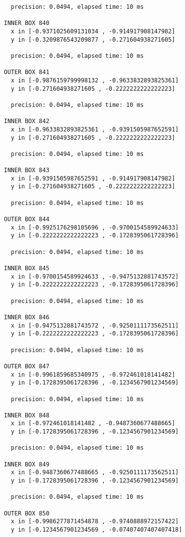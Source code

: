 \begin{verbatim}
  precision: 0.0494, elapsed time: 10 ms

INNER BOX 840
  x in [-0.9371025609131034 , -0.914917908147982]
  y in [-0.3209876543209877 , -0.271604938271605]

  precision: 0.0494, elapsed time: 10 ms

OUTER BOX 841
  x in [-0.9876159799998132 , -0.9633832893825361]
  y in [-0.271604938271605 , -0.2222222222222223]

  precision: 0.0494, elapsed time: 10 ms

INNER BOX 842
  x in [-0.9633832893825361 , -0.9391505987652591]
  y in [-0.271604938271605 , -0.2222222222222223]

  precision: 0.0494, elapsed time: 10 ms

INNER BOX 843
  x in [-0.9391505987652591 , -0.914917908147982]
  y in [-0.271604938271605 , -0.2222222222222223]

  precision: 0.0494, elapsed time: 10 ms

OUTER BOX 844
  x in [-0.9925176298105696 , -0.9700154589924633]
  y in [-0.2222222222222223 , -0.1728395061728396]

  precision: 0.0494, elapsed time: 10 ms

INNER BOX 845
  x in [-0.9700154589924633 , -0.9475132881743572]
  y in [-0.2222222222222223 , -0.1728395061728396]

  precision: 0.0494, elapsed time: 10 ms

INNER BOX 846
  x in [-0.9475132881743572 , -0.9250111173562511]
  y in [-0.2222222222222223 , -0.1728395061728396]

  precision: 0.0494, elapsed time: 10 ms

OUTER BOX 847
  x in [-0.9961859685340975 , -0.972461018141482]
  y in [-0.1728395061728396 , -0.1234567901234569]

  precision: 0.0494, elapsed time: 10 ms

INNER BOX 848
  x in [-0.972461018141482 , -0.9487360677488665]
  y in [-0.1728395061728396 , -0.1234567901234569]

  precision: 0.0494, elapsed time: 10 ms

INNER BOX 849
  x in [-0.9487360677488665 , -0.9250111173562511]
  y in [-0.1728395061728396 , -0.1234567901234569]

  precision: 0.0494, elapsed time: 10 ms

OUTER BOX 850
  x in [-0.9986277871454878 , -0.9740888972157422]
  y in [-0.1234567901234569 , -0.07407407407407418]


\end{verbatim}
